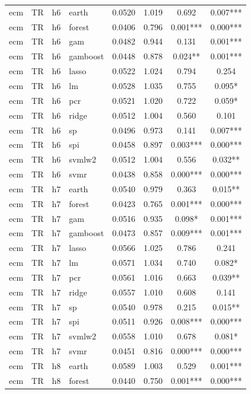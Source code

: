 \begin{ThreePartTable}
\begin{longtable}[t]{llclcccc}
\addlinespace
ecm & TR & h6 & earth & 0.0520 & 1.019 & 0.692 & 0.007***\\
ecm & TR & h6 & forest & 0.0406 & 0.796 & 0.001*** & 0.000***\\
ecm & TR & h6 & gam & 0.0482 & 0.944 & 0.131 & 0.001***\\
ecm & TR & h6 & gamboost & 0.0448 & 0.878 & 0.024** & 0.001***\\
ecm & TR & h6 & lasso & 0.0522 & 1.024 & 0.794 & 0.254\\
ecm & TR & h6 & lm & 0.0528 & 1.035 & 0.755 & 0.095*\\
ecm & TR & h6 & pcr & 0.0521 & 1.020 & 0.722 & 0.059*\\
ecm & TR & h6 & ridge & 0.0512 & 1.004 & 0.560 & 0.101\\
ecm & TR & h6 & sp & 0.0496 & 0.973 & 0.141 & 0.007***\\
ecm & TR & h6 & spi & 0.0458 & 0.897 & 0.003*** & 0.000***\\
ecm & TR & h6 & svmlw2 & 0.0512 & 1.004 & 0.556 & 0.032**\\
ecm & TR & h6 & svmr & 0.0438 & 0.858 & 0.000*** & 0.000***\\
\addlinespace
ecm & TR & h7 & earth & 0.0540 & 0.979 & 0.363 & 0.015**\\
ecm & TR & h7 & forest & 0.0423 & 0.765 & 0.001*** & 0.000***\\
ecm & TR & h7 & gam & 0.0516 & 0.935 & 0.098* & 0.001***\\
ecm & TR & h7 & gamboost & 0.0473 & 0.857 & 0.009*** & 0.001***\\
ecm & TR & h7 & lasso & 0.0566 & 1.025 & 0.786 & 0.241\\
ecm & TR & h7 & lm & 0.0571 & 1.034 & 0.740 & 0.082*\\
ecm & TR & h7 & pcr & 0.0561 & 1.016 & 0.663 & 0.039**\\
ecm & TR & h7 & ridge & 0.0557 & 1.010 & 0.608 & 0.141\\
ecm & TR & h7 & sp & 0.0540 & 0.978 & 0.215 & 0.015**\\
ecm & TR & h7 & spi & 0.0511 & 0.926 & 0.008*** & 0.000***\\
ecm & TR & h7 & svmlw2 & 0.0558 & 1.010 & 0.678 & 0.081*\\
ecm & TR & h7 & svmr & 0.0451 & 0.816 & 0.000*** & 0.000***\\
\addlinespace
ecm & TR & h8 & earth & 0.0589 & 1.003 & 0.529 & 0.001***\\
ecm & TR & h8 & forest & 0.0440 & 0.750 & 0.001*** & 0.000***\\

\end{longtable}
\end{ThreePartTable}
